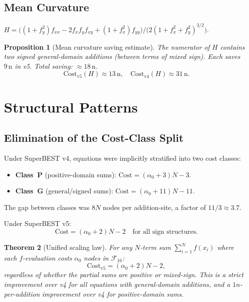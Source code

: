 \documentclass[12pt,a4paper]{article}
\newtheorem{theorem}{Theorem}[section]
\newtheorem{proposition}[theorem]{Proposition}
\theoremstyle{definition}
\newcommand{\Cost}{\mathrm{Cost}}
\begin{document}
\subsection{Mean Curvature}

$H = \bigl((1+f_y^2)f_{xx} - 2f_x f_y f_{xy} + (1+f_x^2)f_{yy}\bigr)
     / \bigl(2(1+f_x^2+f_y^2)^{3/2}\bigr)$.

\begin{proposition}[Mean curvature saving estimate]
The numerator of $H$ contains two signed general-domain additions
(between terms of mixed sign).  Each saves $9\,\text{n}$ in v5.
Total saving: $\approx 18\,\text{n}$.
\[
  \Cost_{\mathrm{v5}}(H) \approx 13\,\text{n}, \quad
  \Cost_{\mathrm{v4}}(H) \approx 31\,\text{n}.
\]
\end{proposition}

\section{Structural Patterns}
\label{sec:patterns}

\subsection{Elimination of the Cost-Class Split}

Under SuperBEST v4, equations were implicitly stratified into two cost classes:
\begin{itemize}
  \item \textbf{Class~P} (positive-domain sums): $\Cost = (\alpha_0 + 3)N - 3$.
  \item \textbf{Class~G} (general/signed sums): $\Cost = (\alpha_0 + 11)N - 11$.
\end{itemize}
The gap between classes was $8N$ nodes per addition-site, a factor of $11/3 \approx 3.7$.

Under SuperBEST v5:
\[
  \Cost = (\alpha_0 + 2)N - 2 \quad \text{for all sign structures.}
\]

\begin{theorem}[Unified scaling law]
\label{thm:unified_scaling}
For any $N$-term sum $\sum_{i=1}^N f(x_i)$ where each $f$-evaluation costs
$\alpha_0$ nodes in $\mathcal{F}_{16}$:
\[
  \Cost_{\mathrm{v5}} = (\alpha_0 + 2)N - 2,
\]
regardless of whether the partial sums are positive or mixed-sign.
This is a strict improvement over v4 for all equations with general-domain additions,
and a $1n$-per-addition improvement over v4 for positive-domain sums.
\end{theorem}
\end{document}
